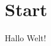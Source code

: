 \documentclass[ngerman]{mluexercise}
\begin{document}
    \maketitle

    \section{Start}

    Hallo Welt!
\end{document}
